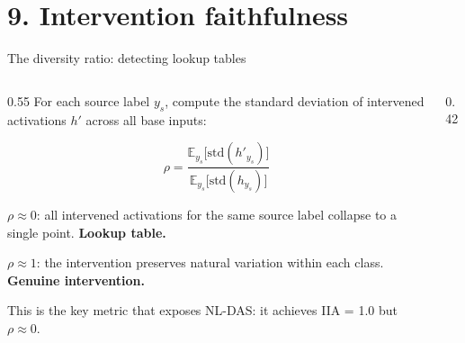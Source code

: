 \documentclass[aspectratio=169,11pt]{beamer}
\begin{document}
\section{9. Intervention faithfulness}

\begin{frame}{The diversity ratio: detecting lookup tables}

\begin{columns}[T]
\begin{column}{0.55\textwidth}
{\small For each source label $y_s$, compute the standard deviation of intervened activations $h'$ across all base inputs:}

$$\rho = \frac{\mathbb{E}_{y_s}\bigl[\text{std}(h'_{y_s})\bigr]}{\mathbb{E}_{y_s}\bigl[\text{std}(h_{y_s})\bigr]}$$

\vspace{0.3em}
{\small $\rho \approx 0$: all intervened activations for the same source label collapse to a single point. \textbf{Lookup table.}}

\vspace{0.3em}
{\small $\rho \approx 1$: the intervention preserves natural variation within each class. \textbf{Genuine intervention.}}

\vspace{0.3em}
{\small This is the key metric that exposes NL-DAS: it achieves IIA = 1.0 but $\rho \approx 0$.}
\end{column}
\begin{column}{0.42\textwidth}
\end{column}
\end{columns}
\end{frame}
\end{document}
